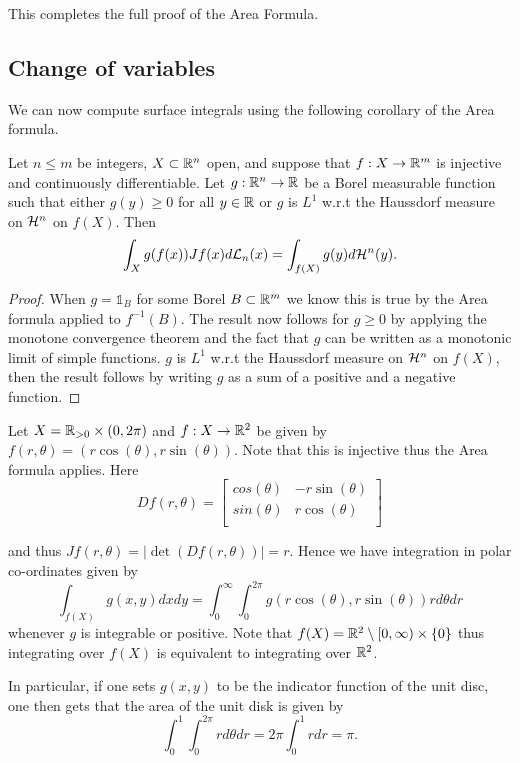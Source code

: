 \documentclass[twoside, a4paper, 10pt]{amsart}
\begin{document}
This completes the full proof of the Area Formula.

\subsection{Change of variables}

We can now compute surface integrals using the following corollary of the Area formula.

\begin{thm} Let $n \leq m$ be integers, $X \subset \mathbb{R}^n$ open, and suppose that $f:X \to \mathbb{R}^m$ is injective and continuously differentiable. Let $g:\mathbb{R}^n \to \mathbb{R}$ be a Borel measurable function such that either $g(y) \geq 0$ for all $y \in \mathbb{R}$ or $g$ is $L^1$ w.r.t the Haussdorf measure on $\mathcal{H}^n$ on $f(X)$. Then $$\int_{X} g(f(x)) Jf(x) d\mathcal{L}_n(x) = \int_{f(X)} g(y) d\mathcal{H}^n(y).$$

\end{thm}

\begin{proof} When $g = \mathds{1}_B$ for some Borel $B \subset \mathbb{R}^m$ we know this is true by the Area formula applied to $f^{-1}(B)$. The result now follows for $g \geq 0$ by applying the monotone convergence theorem and the fact that $g$ can be written as a monotonic limit of simple functions. $g$ is $L^1$ w.r.t the Haussdorf measure on $\mathcal{H}^n$ on $f(X)$, then the result follows by writing $g$ as a sum of a positive and a negative function. \end{proof}

\begin{eg} Let $X = \mathbb{R}_{>0} \times (0,2\pi)$ and $f:X \to \mathbb{R}^2$ be given by $f(r,\theta) = (r \cos(\theta), r\sin(\theta))$. Note that this is injective thus the Area formula applies. Here $$Df(r,\theta) = \begin{bmatrix}
    cos(\theta)   & -r\sin(\theta) \\
    sin(\theta)  & r\cos(\theta) \\
\end{bmatrix} $$

and thus $Jf(r,\theta) = |\det(Df(r,\theta))| = r$. Hence we have integration in polar co-ordinates given by
$$ \int_{f(X)} g(x,y) dxdy = \int_{0}^{\infty} \int_{0}^{2\pi} g(r\cos(\theta), r\sin(\theta)) r d\theta dr$$ whenever $g$ is integrable or positive. Note that $f(X) = \mathbb{R}^2 \setminus [0,\infty) \times \{0\}$ thus integrating over $f(X)$ is equivalent to integrating over $\mathbb{R}^2$. 

In particular, if one sets $g(x,y)$ to be the indicator function of the unit disc, one then gets that the area of the unit disk is given by $$\int_{0}^1 \int_{0}^{2\pi} r d\theta dr = 2\pi \int_{0}^1 r dr = \pi.$$

\end{eg}
\end{document}
